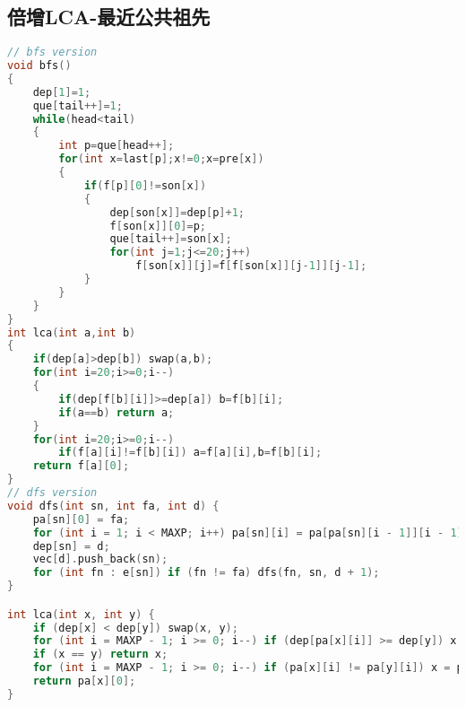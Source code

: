 \subsection{倍增LCA-最近公共祖先}
    \begin{lstlisting}[language=c++]
// bfs version
void bfs()
{
    dep[1]=1;
    que[tail++]=1;
    while(head<tail)
    {
        int p=que[head++];
        for(int x=last[p];x!=0;x=pre[x])
        {
            if(f[p][0]!=son[x])
            {
                dep[son[x]]=dep[p]+1;
                f[son[x]][0]=p;
                que[tail++]=son[x];
                for(int j=1;j<=20;j++)
                    f[son[x]][j]=f[f[son[x]][j-1]][j-1];
            }    
        }    
    }
}
int lca(int a,int b)
{
    if(dep[a]>dep[b]) swap(a,b);
    for(int i=20;i>=0;i--)
    {
        if(dep[f[b][i]]>=dep[a]) b=f[b][i];
        if(a==b) return a;    
    }    
    for(int i=20;i>=0;i--)
        if(f[a][i]!=f[b][i]) a=f[a][i],b=f[b][i];
    return f[a][0];
}
// dfs version
void dfs(int sn, int fa, int d) {
    pa[sn][0] = fa;
    for (int i = 1; i < MAXP; i++) pa[sn][i] = pa[pa[sn][i - 1]][i - 1];
    dep[sn] = d;
    vec[d].push_back(sn);
    for (int fn : e[sn]) if (fn != fa) dfs(fn, sn, d + 1);
}

int lca(int x, int y) {
    if (dep[x] < dep[y]) swap(x, y);
    for (int i = MAXP - 1; i >= 0; i--) if (dep[pa[x][i]] >= dep[y]) x = pa[x][i];
    if (x == y) return x;
    for (int i = MAXP - 1; i >= 0; i--) if (pa[x][i] != pa[y][i]) x = pa[x][i], y = pa[y][i];
    return pa[x][0];
}
    \end{lstlisting}